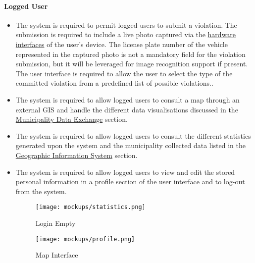 \clearpage\paragraph{Logged User}
	\begin{itemize}
		\item The system is required to permit logged users to submit a violation. The submission is required to include a live photo captured via the \hyperref[sec:hardwareinterfaces]{hardware interfaces} of the user's device. The license plate number of the vehicle represented in the captured photo is not a mandatory field for the violation submission, but it will be leveraged for image recognition support if present. The user interface is required to allow the user to select the type of the committed violation from a predefined list of possible violations..			
		
		\item The system is required to allow logged users to consult a map through an external GIS and handle the different data visualisations discussed in the \hyperref[p:mde]{Municipality Data Exchange} section.
					 
			
			
		\item The system is required to allow logged users to consult the different statistics generated upon the system and the municipality collected data listed in the \hyperref[p:mde]{Geographic Information System} section.
		\item The system is required to allow logged users to view and edit the stored personal information in a profile section of the user interface and to log-out from the system. \newline\newline
			
			\begin{figure}[h]
  				\centering
  				\begin{minipage}[b]{0.4\textwidth}
    				\texttt{[image: mockups/statistics.png]}
    					\caption{Login Empty}
  				\end{minipage}
  				\hfill
  				\begin{minipage}[b]{0.4\textwidth}
    				\texttt{[image: mockups/profile.png]}
    				\caption{Map Interface}
  				\end{minipage}
			\end{figure}
	\end{itemize}

\clearpage

